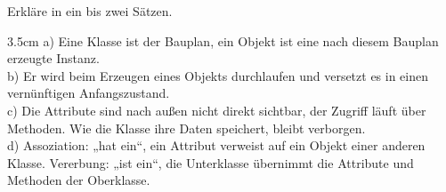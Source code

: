 \question[4]
Erkläre in ein bis zwei Sätzen.
\begin{solutionbox}{3.5cm}
a) Eine Klasse ist der Bauplan, ein Objekt ist eine nach diesem Bauplan erzeugte Instanz. \\
b) Er wird beim Erzeugen eines Objekts durchlaufen und versetzt es in einen vernünftigen Anfangszustand. \\
c) Die Attribute sind nach außen nicht direkt sichtbar, der Zugriff läuft über Methoden. Wie die Klasse ihre
Daten speichert, bleibt verborgen. \\
d) Assoziation: „hat ein“, ein Attribut verweist auf ein Objekt einer anderen Klasse. Vererbung: „ist ein“, die
Unterklasse übernimmt die Attribute und Methoden der Oberklasse.
\end{solutionbox}
